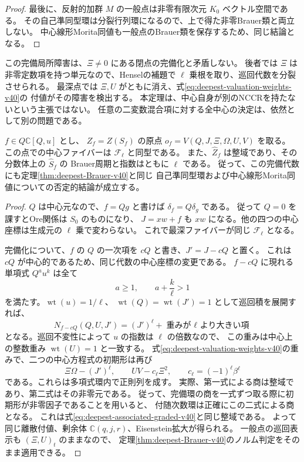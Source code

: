 \begin{proof}
最後に、反射的加群 $M$ の一般点は非零有限次元 $K_0$ ベクトル空間である。
その自己準同型環は分裂行列環になるので、上で得た非零Brauer類と両立しない。
中心線形Morita同値も一般点のBrauer類を保存するため、同じ結論となる。
\end{proof}

この完備局所障害は、$\Xi\ne0$ にある閉点の完備化と矛盾しない。
後者では $\Xi$ は非零定数項を持つ単元なので、Henselの補題で
$\ell$ 乗根を取り、巡回代数を分裂させられる。
最深点では $\Xi,U$ がともに消え、式\eqref{eq:deepest-valuation-weights-v40}の
付値がその障害を検出する。
本定理は、中心自身が別のNCCRを持たないという主張ではない。
任意の二変数混合項に対する全中心の決定は、依然として別の問題である。

\begin{corollary}[$Q$ で割り切れる混合項の最深点]
\label{cor:deepest-Q-divisible-v40}
$f\in Q\mathbb C[Q,u]$ とし、
$Z_f=Z(S_f)$ の原点 $o_f=V(Q,J,\Xi,\Omega,U,V)$ を取る。
この点での中心ファイバーは $\mathcal F_\ell$ と同型である。
また、$\widehat Z_f$ は整域であり、その分数体上の $\widehat S_f$ の
Brauer周期と指数はともに $\ell$ である。
従って、この完備代数にも定理\ref{thm:deepest-Brauer-v40}と同じ
自己準同型環および中心線形Morita同値についての否定的結論が成立する。
\end{corollary}

\begin{proof}
$Q$ は中心元なので、$f=Qg$ と書けば $\delta_f=Q\delta_g$ である。
従って $Q=0$ を課すとOre関係は $S_0$ のものになり、
$J=xw+f$ も $xw$ になる。他の四つの中心座標は生成元の $\ell$ 乗で変わらない。
これで最深ファイバーが同じ $\mathcal F_\ell$ となる。

完備化について、$f$ の $Q$ の一次項を $cQ$ と書き、$J'=J-cQ$ と置く。
これは $cQ$ が中心的であるため、同じ代数の中心座標の変更である。
$f-cQ$ に現れる単項式 $Q^a u^k$ は全て
\[
 a\ge1,\qquad a+\frac{k}{\ell}>1
\]
を満たす。$\operatorname{wt}(u)=1/\ell$、
$\operatorname{wt}(Q)=\operatorname{wt}(J')=1$ として巡回積を展開すれば、
\[
 N_{f-cQ}(Q,U,J')=(J')^\ell+\text{重みが $\ell$ より大きい項}
\]
となる。巡回不変性によって $u$ の指数は $\ell$ の倍数なので、
この重みは中心上の整数重み $\operatorname{wt}(U)=1$ と一致する。
式\eqref{eq:deepest-valuation-weights-v40}の重みで、二つの中心方程式の初期形は再び
\[
 \Xi\Omega-(J')^\ell,\qquad UV-c_\ell\Xi^2,
 \qquad c_\ell=(-1)^\ell\beta^\ell
\]
である。これらは多項式環内で正則列を成す。
実際、第一式による商は整域であり、第二式はその非零元である。
従って、完備環の商を一式ずつ取る際に初期形が非零因子であることを用いると、
付随次数環は正確にこの二式による商となる。
これは式\eqref{eq:deepest-associated-graded-v40}と同じ整域である。
よって同じ離散付値、剰余体 $\mathbb C(q,j,r)$、Eisenstein拡大が得られる。
一般点の巡回表示も $(\Xi,U)_t$ のままなので、
定理\ref{thm:deepest-Brauer-v40}のノルム判定をそのまま適用できる。
\end{proof}

